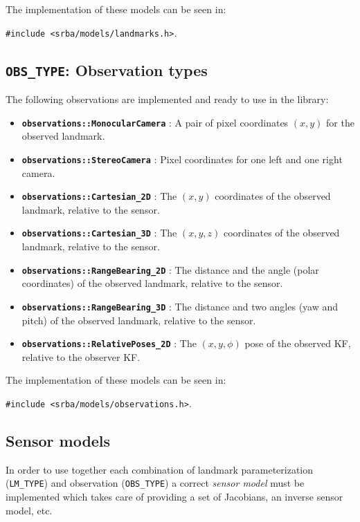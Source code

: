 \documentclass[a4paper,11pt]{article}
\begin{document}
The implementation of these models can be seen in:

\texttt{\#include <srba/models/landmarks.h>}.

\vspace{1cm}
\subsection{\texttt{OBS\_TYPE}: Observation types}

The following observations are implemented and ready to use in the library:

\begin{itemize}
\item{\textbf{ \texttt{observations::MonocularCamera} }: A pair of pixel coordinates $(x,y)$ for the observed landmark.}
\item{\textbf{ \texttt{observations::StereoCamera} }: Pixel coordinates for one left and one right camera.}
\item{\textbf{ \texttt{observations::Cartesian\_2D} }: The $(x,y)$ coordinates of the observed landmark, relative to the sensor.}
\item{\textbf{ \texttt{observations::Cartesian\_3D} }: The $(x,y,z)$ coordinates of the observed landmark, relative to the sensor.}
\item{\textbf{ \texttt{observations::RangeBearing\_2D} }: The distance and the angle (polar coordinates) of the observed landmark, relative to
the sensor.}
\item{\textbf{ \texttt{observations::RangeBearing\_3D} }: The distance and two angles (yaw and pitch) of the observed landmark, relative
to the sensor.}
\item{\textbf{ \texttt{observations::RelativePoses\_2D} }: The $(x,y,\phi)$ pose of the observed KF, relative to the observer KF.}
\end{itemize}

The implementation of these models can be seen in:

\texttt{\#include <srba/models/observations.h>}.


\subsection{Sensor models}
\label{sect:program_sensors}

In order to use together each combination of landmark parameterization (\texttt{LM\_TYPE}) and 
observation (\texttt{OBS\_TYPE}) a correct \emph{sensor model} must be implemented which 
takes care of providing a set of Jacobians, an inverse sensor model, etc.
\end{document}
